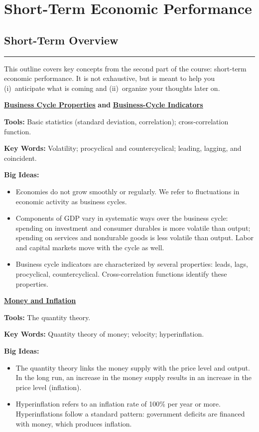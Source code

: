 \part{Short-Term Economic Performance}


\chapter*{Short-Term Overview}
\hypertarget{srp}{}

\rule{\textwidth}{1pt}

This outline covers key concepts from the second part of the course:
short-term economic performance.
It is not exhaustive, but is meant to help you
(i)~anticipate what is coming and
(ii)~organize your thoughts later on.


\medskip
\textbf{\hyperref[chp:bcpr]{\underline{Business Cycle Properties}}} \textbf{and} \textbf{\hyperref[chp:bcin]{\underline{Business-Cycle Indicators}}}

\textbf{Tools:} Basic statistics (standard deviation, correlation); cross-correlation function.

\textbf{Key Words:} Volatility; procyclical and countercyclical;  leading, lagging, and coincident.

\textbf{Big Ideas:}
\vspace{-0.1in}
\begin{itemize}
\item Economies do not grow smoothly or regularly. 
We refer to fluctuations in economic activity as business cycles.
\item Components of GDP vary in systematic ways over the business cycle: spending on investment and consumer durables is more volatile than output; spending on services and nondurable goods is less volatile than output. Labor and capital markets move with the cycle as well.
\item Business cycle indicators are characterized by several properties: leads, lags, procyclical, countercyclical. Cross-correlation functions identify these properties.
\end{itemize}


\hyperref[chp:mpin]{\textbf{\underline{Money and Inflation}}}

\textbf{Tools:} The quantity theory.

\textbf{Key Words:} Quantity theory of money; velocity; hyperinflation.

\textbf{Big Ideas:}
\vspace{-0.1in}
\begin{itemize}
\item The quantity theory links the money supply with the price level and output. In the long run, an increase in the money supply results in an increase in the price level (inflation).
\item Hyperinflation refers to an inflation rate of 100\% per year or more.
Hyperinflations follow a standard pattern: government deficits are financed with money,
which produces inflation.
\end{itemize}


